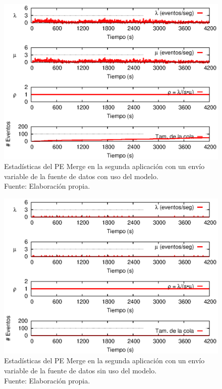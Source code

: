 \begin{figure}[!ht]
    \centering
    \captionsetup{justification=centering}
    \includegraphics[scale=1]{images/exp/app2/normal/cm/statusMergePE.eps}
    \caption[Estad\'isticas del PE Merge en la segunda aplicaci\'on con un env\'io variable de la fuente de datos con uso del modelo.]{Estad\'isticas del PE Merge en la segunda aplicaci\'on con un env\'io variable de la fuente de datos con uso del modelo.\\Fuente: Elaboraci\'on propia.}
    \label{fig:app2-normal-statusMergePE-cm}
\end{figure}

\begin{figure}[!ht]
    \centering
    \captionsetup{justification=centering}
    \includegraphics[scale=1]{images/exp/app2/normal/sm/statusMergePE.eps}
    \caption[Estad\'isticas del PE Merge en la segunda aplicaci\'on con un env\'io variable de la fuente de datos sin uso del modelo.]{Estad\'isticas del PE Merge en la segunda aplicaci\'on con un env\'io variable de la fuente de datos sin uso del modelo.\\Fuente: Elaboraci\'on propia.}
    \label{fig:app2-normal-statusMergePE-sm}
\end{figure}

